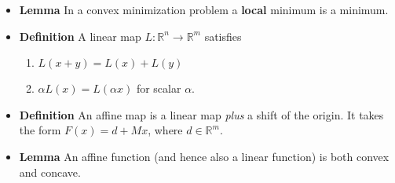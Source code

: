 \documentclass[11pt,a4paper]{article}
\begin{document}
\begin{itemize}
    \item \textbf{Lemma} In a convex minimization problem a \textbf{local} minimum is a
         minimum.

    \item \textbf{Definition} A linear map $L : \mathbb{R}^n \to \mathbb{R}^m$ satisfies
        \begin{enumerate}
            \item $L(x + y) = L(x) + L(y)$
            \item $\alpha L(x) = L(\alpha x)$ for scalar $\alpha$.
        \end{enumerate}

    \item \textbf{Definition} An affine map is a linear map \emph{plus} a shift of the origin.
        It takes the form $F(x) = d + Mx$, where $d \in \mathbb{R}^m$.

    \item \textbf{Lemma} An affine function (and hence also a linear function) is both
        convex and concave.

\end{itemize}
\end{document}
